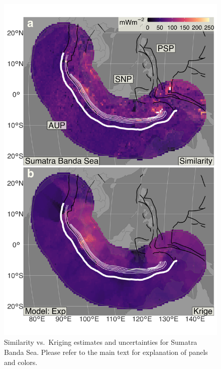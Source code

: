 \begin{figure}
\centering
\includegraphics{assets/figs/chpt3/SumatraBandaSeaDiffComp.png}
\caption[Similarity vs.~Kriging estimates and uncertainties for Sumatra Banda Sea]{Similarity vs.~Kriging estimates and uncertainties for Sumatra Banda Sea. Please refer to the main text for explanation of panels and colors.}
\end{figure}

